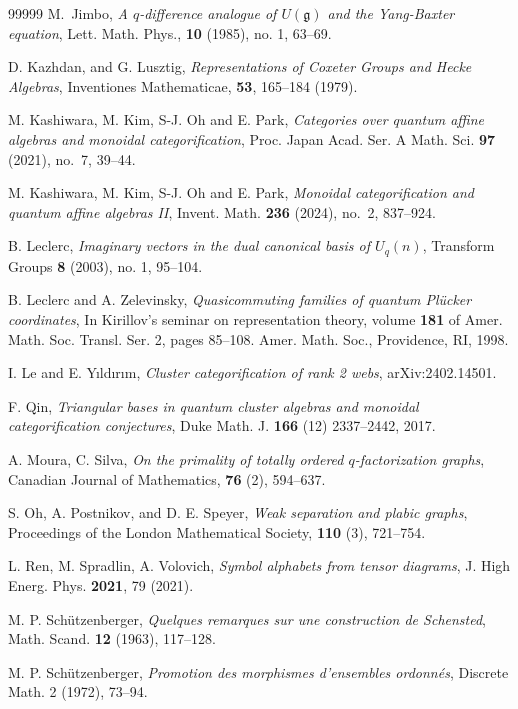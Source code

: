 \documentclass[12pt, reqno]{amsart}
\theoremstyle{plain}
\theoremstyle{definition}
\numberwithin{equation}{section}
\begin{document}
\begin{thebibliography}{99999}
 M.~Jimbo, \textit{A $q$-difference analogue of $U(\mathfrak{g})$ and the Yang-Baxter equation},
Lett. Math. Phys., \textbf{10} (1985), no. 1, 63--69.

 D. Kazhdan, and G. Lusztig, \textit{Representations of Coxeter Groups and Hecke Algebras}, Inventiones Mathematicae, \textbf{53}, 165--184 (1979).

 M. Kashiwara, M. Kim, S-J. Oh and E. Park, \textit{Categories over quantum affine algebras and
monoidal categorification}, Proc. Japan Acad. Ser. A Math. Sci. {\bf 97} (2021), no.~7, 39--44.

 M. Kashiwara, M. Kim, S-J. Oh and E. Park, \textit{Monoidal categorification and quantum affine
algebras II}, Invent. Math. {\bf 236} (2024), no.~2, 837--924. 

 B. Leclerc, \textit{Imaginary vectors in the dual canonical basis of $U_{q}(n)$}, Transform Groups \textbf{8} (2003), no. 1, 95--104.

 B. Leclerc and A. Zelevinsky, \textit{Quasicommuting families of quantum Pl\"{u}cker coordinates}, In Kirillov's seminar on representation theory, volume \textbf{181} of Amer. Math. Soc. Transl. Ser. 2, pages 85--108. Amer. Math. Soc., Providence, RI, 1998.

 I. Le and E. Y\i ld\i r\i m, \textit{Cluster categorification of rank 2 webs}, arXiv:2402.14501. 

 F. Qin, \textit{Triangular bases in quantum cluster algebras and monoidal categorification conjectures}, Duke Math. J. \textbf{166} (12) 2337--2442, 2017. 
 
 A. Moura, C. Silva, \textit{On the primality of totally ordered $q$-factorization graphs}, Canadian Journal of Mathematics, \textbf{76} (2), 594--637.

 S. Oh, A. Postnikov, and D. E. Speyer, \textit{Weak separation and plabic graphs}, Proceedings of the London Mathematical Society, \textbf{110} (3), 721--754.

 L. Ren, M. Spradlin, A. Volovich, \textit{Symbol alphabets from tensor diagrams}, J. High Energ. Phys. \textbf{2021}, 79 (2021).
 
 M. P. Sch\"{u}tzenberger, \textit{Quelques remarques sur une construction de Schensted}, Math. Scand. \textbf{12} (1963), 117--128.

 M. P. Sch\"{u}tzenberger, \textit{Promotion des morphismes d'ensembles ordonn\'{e}s}, Discrete Math. 2 (1972), 73--94.


\end{thebibliography}
\end{document}
